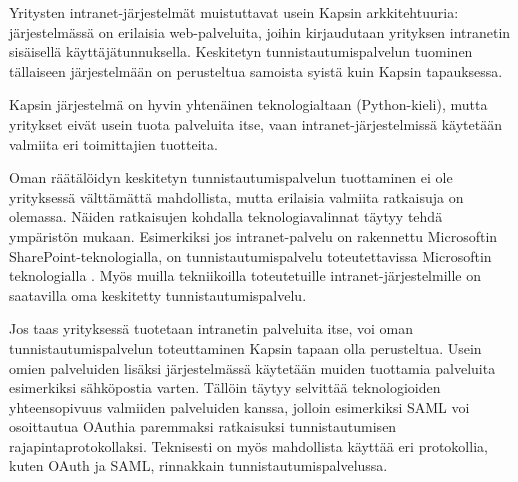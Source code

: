Yritysten intranet-järjestelmät muistuttavat usein Kapsin arkkitehtuuria: järjestelmässä on erilaisia web-palveluita, joihin kirjaudutaan yrityksen intranetin sisäisellä käyttäjätunnuksella. Keskitetyn tunnistautumispalvelun tuominen tällaiseen järjestelmään on perusteltua samoista syistä kuin Kapsin tapauksessa.

Kapsin järjestelmä on hyvin yhtenäinen teknologialtaan (Python-kieli), mutta yritykset eivät usein tuota palveluita itse, vaan intranet-järjestelmissä käytetään valmiita eri toimittajien tuotteita.

Oman räätälöidyn keskitetyn tunnistautumispalvelun tuottaminen ei ole yrityksessä välttämättä mahdollista, mutta erilaisia valmiita ratkaisuja on olemassa. Näiden ratkaisujen kohdalla teknologiavalinnat täytyy tehdä ympäristön mukaan. Esimerkiksi jos intranet-palvelu on rakennettu Microsoftin SharePoint-teknologialla, on tunnistautumispalvelu toteutettavissa Microsoftin teknologialla \cite{sharepoint}. Myös muilla tekniikoilla toteutetuille intranet-järjestelmille on saatavilla oma keskitetty tunnistautumispalvelu.

Jos taas yrityksessä tuotetaan intranetin palveluita itse, voi oman tunnistautumispalvelun toteuttaminen Kapsin tapaan olla perusteltua. Usein omien palveluiden lisäksi järjestelmässä käytetään muiden tuottamia palveluita esimerkiksi sähköpostia varten. Tällöin täytyy selvittää teknologioiden yhteensopivuus valmiiden palveluiden kanssa, jolloin esimerkiksi SAML voi osoittautua OAuthia paremmaksi ratkaisuksi tunnistautumisen rajapintaprotokollaksi. Teknisesti on myös mahdollista käyttää eri protokollia, kuten OAuth ja SAML, rinnakkain tunnistautumispalvelussa.